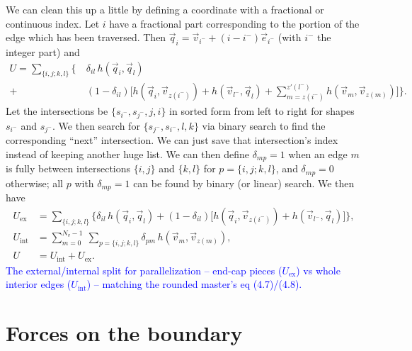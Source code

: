 \documentclass[11pt]{article}
\numberwithin{equation}{section}
\newcommand{\vv}[1]{\vec{#1}}
\newcommand{\cam}[1]{\textcolor{blue}{#1}}
\begin{document}
We can clean this up a little by defining a coordinate with a fractional or continuous index. Let $i$
have a fractional part corresponding to the portion of the edge which has been traversed. Then $\vv
q_i=\vv v_{i^-}+(i-i^-)\vv e_{i^-}$ (with $i^-$ the integer part) and
\begin{equation}
\begin{aligned}
  U=\sum_{\{i,j;k,l\}}\Big\{\ &\delta_{il}\,h(\vv q_i,\vv q_l)\\
  +\ &(1-\delta_{il})\Big[h(\vv q_i,\vv v_{z(i^-)})+h(\vv v_{l^-},\vv q_l)
  +\sum_{m=z(i^-)}^{z'(l^-)}h(\vv v_m,\vv v_{z(m)})\Big]\Big\}.
\end{aligned}
\end{equation}
Let the intersections be $\{s_{i^-},s_{j^-},j,i\}$ in sorted form from left to right for shapes
$s_{i^-}$ and $s_{j^-}$. We then search for $\{s_{j^-},s_{i^-},l,k\}$ via binary search to find the
corresponding ``next'' intersection. We can just save that intersection's index instead of keeping
another huge list. We can then define $\delta_{mp}=1$ when an edge $m$ is fully between
intersections $\{i,j\}$ and $\{k,l\}$ for $p=\{i,j;k,l\}$, and $\delta_{mp}=0$ otherwise; all $p$
with $\delta_{mp}=1$ can be found by binary (or linear) search. We then have
\begin{equation}
\begin{aligned}
  U_{\text{ex}}&=\sum_{\{i,j;k,l\}}\Big\{\delta_{il}\,h(\vv q_i,\vv q_l)
  +(1-\delta_{il})\big[h(\vv q_i,\vv v_{z(i^-)})+h(\vv v_{l^-},\vv q_l)\big]\Big\},\\
  U_{\text{int}}&=\sum_{m=0}^{N_v-1}\ \sum_{p=\{i,j;k,l\}}\delta_{pm}\,h(\vv v_m,\vv v_{z(m)}),\\
  U&=U_{\text{int}}+U_{\text{ex}}.
\end{aligned}
\end{equation}
\cam{The external/internal split for parallelization -- end-cap pieces ($U_{\text{ex}}$) vs whole
interior edges ($U_{\text{int}}$) -- matching the rounded master's eq (4.7)/(4.8).}

\section{Forces on the boundary}\label{sec:sharpforce}
\end{document}
